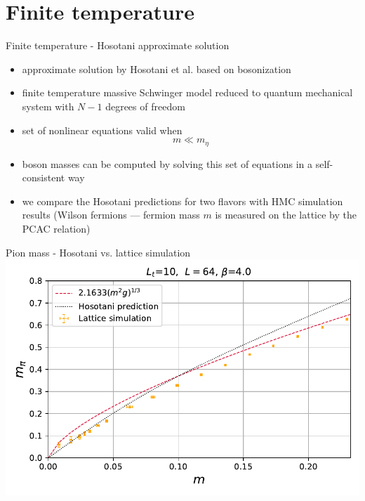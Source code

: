 \documentclass[english]{beamer}
\begin{document}
  
\section{Finite temperature}

\begin{frame}{Finite temperature - Hosotani approximate solution}
  \begin{itemize}
    \item approximate solution by Hosotani et al.
      based on bosonization
    \item finite temperature massive Schwinger model reduced to
      quantum mechanical system with $N - 1$ degrees of freedom
    \item set of nonlinear equations valid when
      \[
        m \ll m_\eta
      \]
    \item boson masses can be computed by solving this set of 
      equations in a self-consistent way
    \item we compare the Hosotani predictions for two flavors
      with HMC simulation results (Wilson fermions --- fermion mass
      $m$ is measured on the lattice by the PCAC relation)
  \end{itemize}
\end{frame}

\begin{frame}{Pion mass - Hosotani vs. lattice simulation}
  \includegraphics[width=1\textwidth]{figs/MPi64x10vsMFiniteT_Pt2}
\end{frame}
\end{document}
